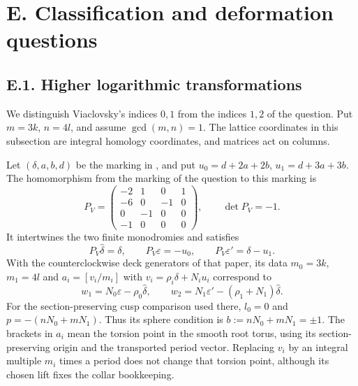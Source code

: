 \section{E. Classification and deformation questions}
\subsection{E.1. Higher logarithmic transformations}
We distinguish Viaclovsky's indices $0,1$ from the indices $1,2$ of
the question.  Put $m=3k$, $n=4l$, and assume $\gcd(m,n)=1$.
The lattice coordinates in this subsection are integral homology
coordinates, and matrices act on columns.

\begin{proposition}\label{push:src:E.1.1}
Let $(\delta,a,b,d)$ be the marking in
\cite[Section 2, equations (2.1), (2.2), (2.7), (2.11)--(2.12)]{ViaLog26push},
and put $u_0=d+2a+2b$, $u_1=d+3a+3b$.
The homomorphism from the marking of the question to this marking is
\[
 P_V=\begin{pmatrix}
 -2&1&0&1\\-6&0&-1&0\\0&-1&0&0\\-1&0&0&0
 \end{pmatrix},\qquad \det P_V=-1.
\]
It intertwines the two finite monodromies and satisfies
\[
 P_V\widehat\delta=\delta,\qquad
 P_V\varepsilon=-u_0,\qquad
 P_V\varepsilon'=\delta-u_1.
\]
With the counterclockwise deck generators of that paper, its data
$m_0=3k$, $m_1=4l$ and
$a_i=[v_i/m_i]$ with $v_i=\rho_i\delta+N_i u_i$ correspond to
\[
 w_1=N_0\varepsilon-\rho_0\widehat\delta,
 \qquad
 w_2=N_1\varepsilon'-(\rho_1+N_1)\widehat\delta.
\]
For the section-preserving cusp comparison used there, $l_0=0$ and
$p=-(nN_0+mN_1)$.  Thus its sphere condition is
$b:=nN_0+mN_1=\pm1$.
The brackets in $a_i$ mean the torsion point in the smooth
root torus, using its section-preserving origin and the
transported period vector.  Replacing $v_i$ by an integral
multiple $m_i$ times a period does not change that torsion
point, although its chosen lift fixes the collar bookkeeping.
\end{proposition}

